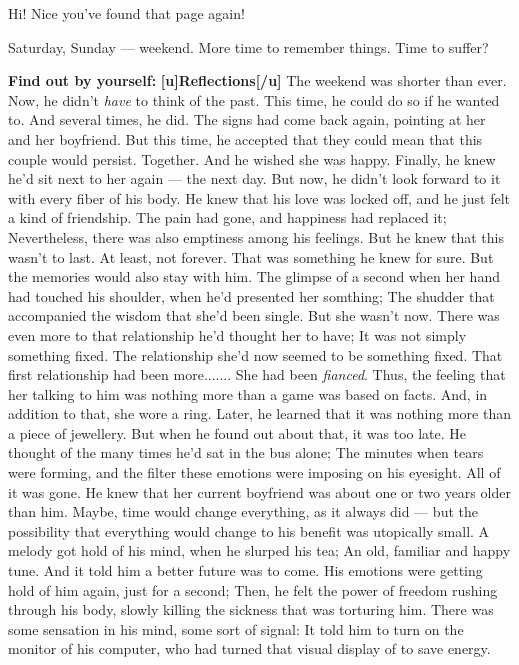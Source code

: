 Hi! Nice you've found that page again!

Saturday, Sunday --- weekend. 
More time to remember things. 
Time to suffer? 

\textbf{Find out by yourself:}
\textbf{[u]Reflections[/u]}
The weekend was shorter than ever. 
Now, he didn't \emph{have} to think of the past. 
This time, he could do so if he wanted to. 
And several times, he did. 
The signs had come back again, pointing at her and her boyfriend. But this time, he accepted that they could mean that this couple would persist. Together. 
And he wished she was happy. 
Finally, he knew he'd sit next to her again --- the next day. 
But now, he didn't look forward to it with every fiber of his body. 
He knew that his love was locked off, and he just felt a kind of friendship. The pain had gone, and happiness had replaced it; Nevertheless, there was also emptiness among his feelings. 
But he knew that this wasn't to last. 
At least, not forever. 
That was something he knew for sure. 
But the memories would also stay with him. 
The glimpse of a second when her hand had touched his shoulder, when he'd presented her somthing; The shudder that accompanied the wisdom that she'd been single. 
But she wasn't now. 
There was even more to that relationship he'd thought her to have; It was not simply something fixed. The relationship she'd now seemed to be something fixed. That first relationship had been more.......
She had been \emph{fianced}. 
Thus, the feeling that her talking to him was nothing more than a game was based on facts. 
And, in addition to that, she wore a ring. 
Later, he learned that it was nothing more than a piece of jewellery. 
But when he found out about that, it was too late. 
He thought of the many times he'd sat in the bus alone; The minutes when tears were forming, and the filter these emotions were imposing on his eyesight. 
All of it was gone. 
He knew that her current boyfriend was about one or two years older than him. 
Maybe, time would change everything, as it always did --- but the possibility that everything would change to his benefit was utopically small. 
A melody got hold of his mind, when he slurped his tea; An old, familiar and happy tune. 
And it told him a better future was to come. 
His emotions were getting hold of him again, just for a second; Then, he felt the power of freedom rushing through his body, slowly killing the sickness that was torturing him. 
There was some sensation in his mind, some sort of signal: It told him to turn on the monitor of his computer, who had turned that visual display of to save energy. 
